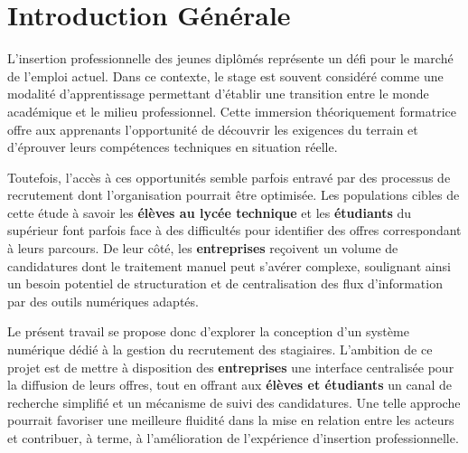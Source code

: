 \documentclass[12pt,a4paper,oneside]{memoir}
\let\cleardoublepage\clearpage
\begin{document}
	\cleardoublepage
	\renewcommand{\contentsname}{SOMMAIRE}
	\setcounter{tocdepth}{1} %
	\tableofcontents

	\cleardoublepage
	\setcounter{page}{1}
	
	\def\toclevel@chapter{0}

	\hypersetup{pageanchor=true} %
	\chapter*{Introduction Générale}
	
	L'insertion professionnelle des jeunes diplômés représente un défi pour le marché de l'emploi actuel. Dans ce contexte, le stage est souvent considéré comme une modalité d'apprentissage permettant d'établir une transition entre le monde académique et le milieu professionnel. Cette immersion théoriquement formatrice offre aux apprenants l'opportunité de découvrir les exigences du terrain et d'éprouver leurs compétences techniques en situation réelle.
	
	Toutefois, l'accès à ces opportunités semble parfois entravé par des processus de recrutement dont l'organisation pourrait être optimisée. Les populations cibles de cette étude  à savoir les \textbf{élèves au lycée technique} et les \textbf{étudiants} du supérieur  font parfois face à des difficultés pour identifier des offres correspondant à leurs parcours. De leur côté, les \textbf{entreprises} reçoivent un volume de candidatures dont le traitement manuel peut s'avérer complexe, soulignant ainsi un besoin potentiel de structuration et de centralisation des flux d'information par des outils numériques adaptés.
	
	Le présent travail se propose donc d'explorer la conception d'un système numérique dédié à la gestion du recrutement des stagiaires. L'ambition de ce projet est de mettre à disposition des \textbf{entreprises} une interface centralisée pour la diffusion de leurs offres, tout en offrant aux \textbf{élèves et étudiants} un canal de recherche simplifié et un mécanisme de suivi des candidatures. Une telle approche pourrait favoriser une meilleure fluidité dans la mise en relation entre les acteurs et contribuer, à terme, à l'amélioration de l'expérience d'insertion professionnelle.
	
\end{document}
